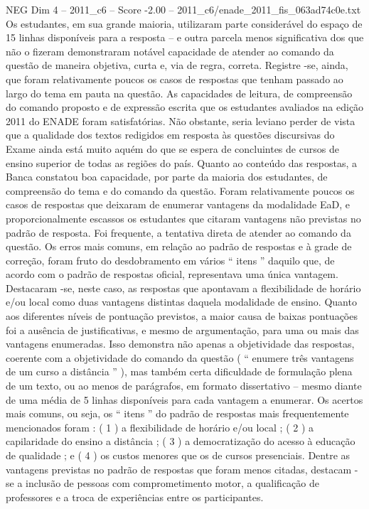 \begin{textsample}{NEG Dim 4 – 2011\_c6 – Score -2.00 – 2011\_c6/enade\_2011\_fis\_063ad74c0e.txt}
Os estudantes, em sua grande maioria, utilizaram parte considerável do espaço de 15 linhas disponíveis para a resposta – e outra parcela menos significativa dos que não o fizeram demonstraram notável capacidade de atender ao comando da questão de maneira objetiva, curta e, via de regra, correta.
Registre -se, ainda, que foram relativamente poucos os casos de respostas que tenham passado ao largo do tema em pauta na questão.
As capacidades de leitura, de compreensão do comando proposto e de expressão escrita que os estudantes avaliados na edição 2011 do ENADE foram satisfatórias.
Não obstante, seria leviano perder de vista que a qualidade dos textos redigidos em resposta às questões discursivas do Exame ainda está muito aquém do que se espera de concluintes de cursos de ensino superior de todas as regiões do país.
Quanto ao conteúdo das respostas, a Banca constatou boa capacidade, por parte da maioria dos estudantes, de compreensão do tema e do comando da questão.
Foram relativamente poucos os casos de respostas que deixaram de enumerar vantagens da modalidade EaD, e proporcionalmente escassos os estudantes que citaram vantagens não previstas no padrão de resposta.
Foi frequente, a tentativa direta de atender ao comando da questão.
Os erros mais comuns, em relação ao padrão de respostas e à grade de correção, foram fruto do desdobramento em vários “ itens ” daquilo que, de acordo com o padrão de respostas oficial, representava uma única vantagem.
Destacaram -se, neste caso, as respostas que apontavam a flexibilidade de horário e/ou local como duas vantagens distintas daquela modalidade de ensino.
Quanto aos diferentes níveis de pontuação previstos, a maior causa de baixas pontuações foi a ausência de justificativas, e mesmo de argumentação, para uma ou mais das vantagens enumeradas.
Isso demonstra não apenas a objetividade das respostas, coerente com a objetividade do comando da questão ( “ enumere três vantagens de um curso a distância ” ), mas também certa dificuldade de formulação plena de um texto, ou ao menos de parágrafos, em formato dissertativo – mesmo diante de uma média de 5 linhas disponíveis para cada vantagem a enumerar.
Os acertos mais comuns, ou seja, os “ itens ” do padrão de respostas mais frequentemente mencionados foram : ( 1 ) a flexibilidade de horário e/ou local ; ( 2 ) a capilaridade do ensino a distância ; ( 3 ) a democratização do acesso à educação de qualidade ; e ( 4 ) os custos menores que os de cursos presenciais.
Dentre as vantagens previstas no padrão de respostas que foram menos citadas, destacam -se a inclusão de pessoas com comprometimento motor, a qualificação de professores e a troca de experiências entre os participantes.

\end{textsample}

